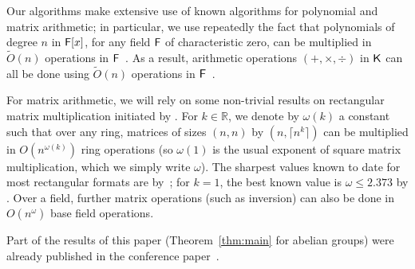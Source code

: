 Our algorithms make extensive use of known algorithms for polynomial and
matrix arithmetic; in particular, we use repeatedly the fact that
polynomials of degree $n$ in ${\mathsf{F}}[x]$, for any field ${\mathsf{F}}$ of
characteristic zero, can be multiplied in $\tilde{O}(n)$ operations in
${\mathsf{F}}$~\citep{ScSt71}. As a result, arithmetic operations
$(+,\times,\div)$ in ${\mathsf{K}}$ can all be done using $\tilde{O}(n)$
operations in ${\mathsf{F}}$~\citep{vzGathen13}.

For matrix arithmetic, we will rely on some non-trivial results on
rectangular matrix multiplication initiated by \cite{LoRo83}. For $k
\in \mathbb{R}$, we denote by $\omega(k)$ a constant such that over
any ring, matrices of sizes $(n,n)$ by $(n,\lceil n^k \rceil)$ can be
multiplied in $O(n^{\omega(k)})$ ring operations (so $\omega(1)$ is
the usual exponent of square matrix multiplication, which we simply
write $\omega$).  The sharpest values known to date for most
rectangular formats are by~\cite{LeGall}; for $k=1$, the best known
value is $\omega \le 2.373$ by .  Over a field,
further matrix operations (such as inversion) can also be done in
$O(n^\omega)$ base field operations.


Part of the results of this paper (Theorem~\ref{thm:main} for abelian
groups) were already published in the conference
paper~\citep{GiJaSc19}.

